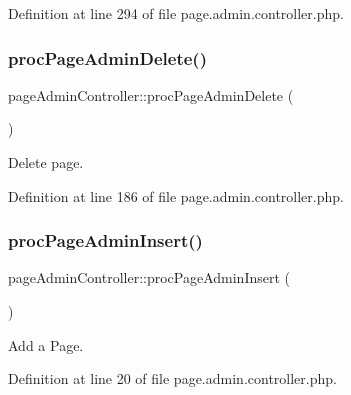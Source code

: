 Definition at line 294 of file page.\+admin.\+controller.\+php.

\hypertarget{classpageAdminController_a11d50b1c3ffb7872eba5519cff6e9e28}{}\label{classpageAdminController_a11d50b1c3ffb7872eba5519cff6e9e28} 
\subsubsection{\texorpdfstring{proc\+Page\+Admin\+Delete()}{procPageAdminDelete()}}
{\footnotesize\ttfamily page\+Admin\+Controller\+::proc\+Page\+Admin\+Delete (\begin{DoxyParamCaption}{ }\end{DoxyParamCaption})}



Delete page. 



Definition at line 186 of file page.\+admin.\+controller.\+php.

\hypertarget{classpageAdminController_ad93c99256e3e6c6d954205e315af9676}{}\label{classpageAdminController_ad93c99256e3e6c6d954205e315af9676} 
\subsubsection{\texorpdfstring{proc\+Page\+Admin\+Insert()}{procPageAdminInsert()}}
{\footnotesize\ttfamily page\+Admin\+Controller\+::proc\+Page\+Admin\+Insert (\begin{DoxyParamCaption}{ }\end{DoxyParamCaption})}



Add a Page. 



Definition at line 20 of file page.\+admin.\+controller.\+php.

\hypertarget{classpageAdminController_a3f1f8463705b9d0daf358097e57feb2d}{}\label{classpageAdminController_a3f1f8463705b9d0daf358097e57feb2d} 
